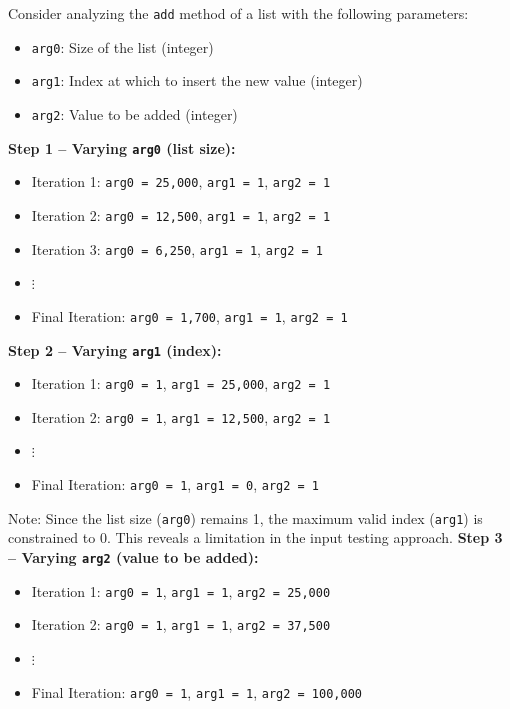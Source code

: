 \begin{tcolorbox}[title=Example: Input Testing Process for \texttt{List.add(index, Element)}, colback=gray!5!white, colframe=gray!75!black, fonttitle=\bfseries, breakable]

Consider analyzing the \texttt{add} method of a list with the following parameters:
\begin{itemize}
    \item \texttt{arg0}: Size of the list (integer)
    \item \texttt{arg1}: Index at which to insert the new value (integer)
    \item \texttt{arg2}: Value to be added (integer)
\end{itemize}

\textbf{Step 1 – Varying \texttt{arg0} (list size):}

\begin{itemize}
    \item Iteration 1: \texttt{arg0 = 25,000}, \texttt{arg1 = 1}, \texttt{arg2 = 1}
    \item Iteration 2: \texttt{arg0 = 12,500}, \texttt{arg1 = 1}, \texttt{arg2 = 1}
    \item Iteration 3: \texttt{arg0 = 6,250}, \texttt{arg1 = 1}, \texttt{arg2 = 1}
    \item $\vdots$
    \item Final Iteration: \texttt{arg0 = 1,700}, \texttt{arg1 = 1}, \texttt{arg2 = 1}
\end{itemize}


\textbf{Step 2 – Varying \texttt{arg1} (index):}

\begin{itemize}
    \item Iteration 1: \texttt{arg0 = 1}, \texttt{arg1 = 25,000}, \texttt{arg2 = 1}
    \item Iteration 2: \texttt{arg0 = 1}, \texttt{arg1 = 12,500}, \texttt{arg2 = 1}
    \item $\vdots$
    \item Final Iteration: \texttt{arg0 = 1}, \texttt{arg1 = 0}, \texttt{arg2 = 1}
\end{itemize}

{Note: Since the list size (\texttt{arg0}) remains 1, the maximum valid index (\texttt{arg1}) is constrained to 0. This reveals a limitation in the input testing approach.}
\vspace{5mm}
\textbf{Step 3 – Varying \texttt{arg2} (value to be added):}

\begin{itemize}
    \item Iteration 1: \texttt{arg0 = 1}, \texttt{arg1 = 1}, \texttt{arg2 = 25,000}
    \item Iteration 2: \texttt{arg0 = 1}, \texttt{arg1 = 1}, \texttt{arg2 = 37,500}
    \item $\vdots$
    \item Final Iteration: \texttt{arg0 = 1}, \texttt{arg1 = 1}, \texttt{arg2 = 100,000}
\end{itemize}


\end{tcolorbox}

